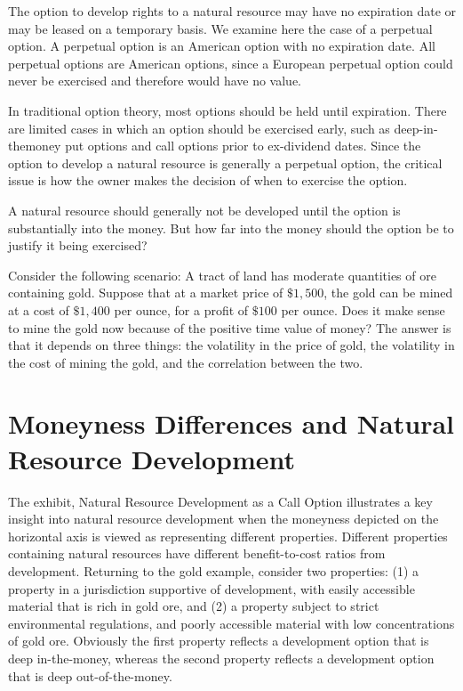 \documentclass[11pt]{article}
\begin{document}
The option to develop rights to a natural resource may have no expiration date or may be leased on a temporary basis. We examine here the case of a perpetual option. A perpetual option is an American option with no expiration date. All perpetual options are American options, since a European perpetual option could never be exercised and therefore would have no value.

In traditional option theory, most options should be held until expiration. There are limited cases in which an option should be exercised early, such as deep-in-themoney put options and call options prior to ex-dividend dates. Since the option to develop a natural resource is generally a perpetual option, the critical issue is how the owner makes the decision of when to exercise the option.

A natural resource should generally not be developed until the option is substantially into the money. But how far into the money should the option be to justify it being exercised?

Consider the following scenario: A tract of land has moderate quantities of ore containing gold. Suppose that at a market price of $\$ 1,500$, the gold can be mined at a cost of $\$ 1,400$ per ounce, for a profit of $\$ 100$ per ounce. Does it make sense to mine the gold now because of the positive time value of money? The answer is that it depends on three things: the volatility in the price of gold, the volatility in the cost of mining the gold, and the correlation between the two.

\section*{Moneyness Differences and Natural Resource Development}
The exhibit, Natural Resource Development as a Call Option illustrates a key insight into natural resource development when the moneyness depicted on the horizontal axis is viewed as representing different properties. Different properties containing natural resources have different benefit-to-cost ratios from development. Returning to the gold example, consider two properties: (1) a property in a jurisdiction supportive of development, with easily accessible material that is rich in gold ore, and (2) a property subject to strict environmental regulations, and poorly accessible material with low concentrations of gold ore. Obviously the first property reflects a development option that is deep in-the-money, whereas the second property reflects a development option that is deep out-of-the-money.
\end{document}
